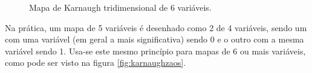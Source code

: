 \begin{figure}
\centering

\caption{Mapa de Karnaugh tridimensional de 6 variáveis.}\label{fig:karnaugh6_3d}
\end{figure}


Na prática, um mapa de 5 variáveis é desenhado como 2 de 4 variáveis, sendo um com uma variável (em geral a mais significativa) sendo 0 e o outro com a mesma variável sendo 1. Usa-se este mesmo princípio para mapas de 6 ou mais variáveis, como pode ser visto na figura \ref{fig:karnaughzaos}.

